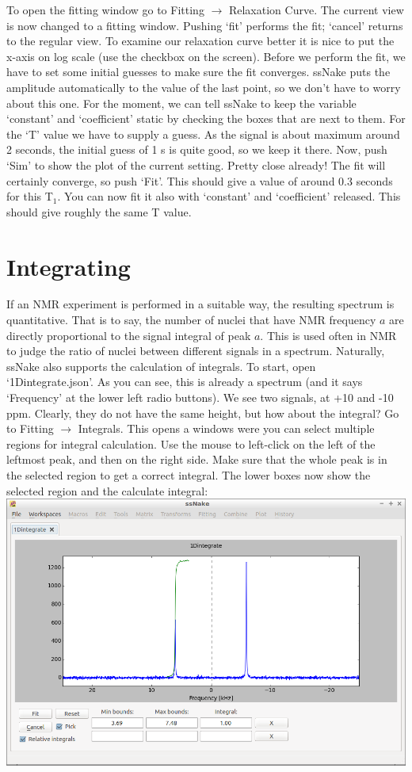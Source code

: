 \documentclass[11pt,a4paper]{article}
\begin{document}
To open the fitting window go to Fitting $\rightarrow$ Relaxation Curve. The current view is now changed to a fitting window. Pushing `fit' performs the fit; `cancel' returns to the regular view. To examine our relaxation curve better it is nice to put the x-axis on log scale (use the checkbox on the screen). Before we perform the fit, we have to set some initial guesses to make sure the fit converges. ssNake puts the amplitude automatically to the value of the last point, so we don't have to worry about this one. For the moment, we can tell ssNake to keep the variable `constant' and `coefficient' static by checking the boxes that are next to them. For the `T' value we have to supply a guess. As the signal is about maximum around 2 seconds, the initial guess of 1 s is quite good, so we keep it there. Now, push `Sim' to show the plot of the current setting. Pretty close already! The fit will certainly converge, so push `Fit'. This should give a value of around 0.3 seconds for this T$_1$. You can now fit it also with `constant' and `coefficient' released. This should give roughly the same T value.

\section{Integrating}
If an NMR experiment is performed in a suitable way, the resulting spectrum is quantitative. That is to say, the number of nuclei that have NMR frequency $a$ are directly proportional to the signal integral of peak $a$. This is used often in NMR to judge the ratio of nuclei between different signals in a spectrum. Naturally, ssNake also supports the calculation of integrals. To start, open `1Dintegrate.json'. As you can see, this is already a spectrum (and it says `Frequency' at the lower left radio buttons). We see two signals, at +10 and -10 ppm. Clearly, they do not have the same height, but how about the integral? Go to Fitting $\rightarrow$ Integrals. This opens a windows were you can select multiple regions for integral calculation. Use the mouse to left-click on the left of the leftmost peak, and then on the right side. Make sure that the whole peak is in the selected region to get a correct integral. The lower boxes now show the selected region and the calculate integral:
\includegraphics[width=\linewidth]{Images/1Dintegrate.png}
\end{document}
